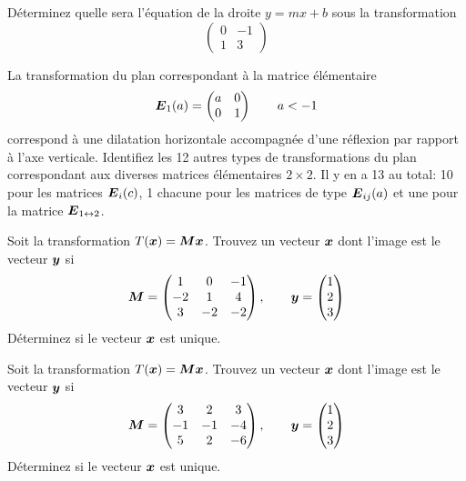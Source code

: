 \begin{TwoCol}
\begin{exercice}
Déterminez quelle sera l'équation de la droite $y=mx+b$ sous la transformation $$\begin{pmatrix}
0 &-1 \\
1 & 3
\end{pmatrix}
$$
\end{exercice}
\begin{exercice}
La transformation du plan correspondant à la matrice élémentaire
\[
\boldsymbol{E}_1(a) = \begin{pmatrix}
a & 0 \\
0 & 1
\end{pmatrix} \qquad a < -1
\]
correspond à une dilatation horizontale accompagnée d'une réflexion par rapport à l'axe
verticale. Identifiez les 12 autres types de transformations du plan correspondant aux
diverses matrices élémentaires $2\times2$. Il y en a 13 au total:
10 pour les matrices $\boldsymbol{E}_i(c)$, 1 chacune pour les matrices de type $\boldsymbol{E}_{ij}(a)$ et
une pour la matrice $\boldsymbol{E}_{1\leftrightarrow 2}$.
\end{exercice}
\begin{exercice}
Soit la transformation $T(\boldsymbol{x}) = \boldsymbol{M}\boldsymbol{x}$. Trouvez un vecteur $\boldsymbol{x}$ dont l'image est
le vecteur $\boldsymbol{y}$ si 
\[
\boldsymbol{M} = \begin{pmatrix}
1 & 0 & -1 \\
-2 & 1 & 4 \\
3 & -2 & -2
\end{pmatrix},
\qquad
\boldsymbol{y} = \begin{pmatrix}
1 \\ 2 \\ 3
\end{pmatrix}
\]
Déterminez si le vecteur $\boldsymbol{x}$ est unique.
\end{exercice}
\begin{exercice}
Soit la transformation $T(\boldsymbol{x}) = \boldsymbol{M}\boldsymbol{x}$. Trouvez un vecteur $\boldsymbol{x}$ dont l'image est
le vecteur $\boldsymbol{y}$ si 
\[
\boldsymbol{M} = \begin{pmatrix}
3 & 2 & 3 \\
-1 & -1 & -4 \\
5 & 2 & -6
\end{pmatrix},
\qquad
\boldsymbol{y} = \begin{pmatrix}
1 \\ 2 \\ 3
\end{pmatrix}
\]
Déterminez si le vecteur $\boldsymbol{x}$ est unique.
\end{exercice}

\end{TwoCol}
